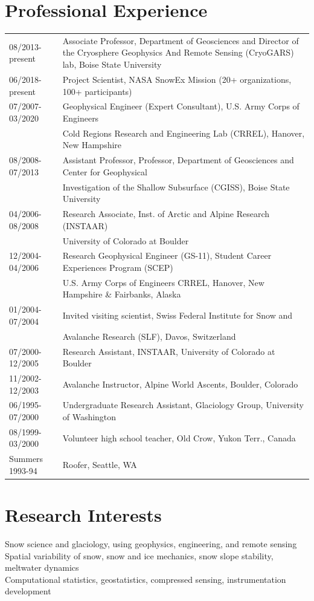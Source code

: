 \documentclass[11pt]{article}
\begin{document}
\section*{Professional Experience}
\begin{tabular}{ll}
08/2013-present & Associate Professor, Department of Geosciences and Director of the Cryosphere
Geophysics And Remote Sensing (CryoGARS) lab, Boise State University \\
06/2018-present & Project Scientist, NASA SnowEx Mission (20+ organizations, 100+ participants) \\
07/2007-03/2020 & Geophysical Engineer (Expert Consultant), U.S. Army Corps of Engineers \\
& Cold Regions Research and Engineering Lab (CRREL), Hanover, New Hampshire \\
08/2008-07/2013 & Assistant Professor, Professor, Department of Geosciences and Center for Geophysical \\
&   Investigation of the Shallow Subsurface (CGISS), Boise State University \\
04/2006-08/2008 & Research Associate, Inst. of Arctic and Alpine Research (INSTAAR) \\
& University of Colorado at Boulder \\ 
12/2004-04/2006 & Research Geophysical Engineer (GS-11), Student Career Experiences Program (SCEP) \\
& U.S. Army Corps of Engineers CRREL, Hanover, New Hampshire \& Fairbanks, Alaska \\
01/2004-07/2004 & Invited visiting scientist, Swiss Federal Institute for Snow and \\ 
& Avalanche Research (SLF), Davos, Switzerland \\ 
07/2000-12/2005 & Research Assistant, INSTAAR, University of Colorado at Boulder \\
11/2002-12/2003 & Avalanche Instructor, Alpine World Ascents, Boulder, Colorado \\
06/1995-07/2000 & Undergraduate Research Assistant, Glaciology Group, University of Washington \\
08/1999-03/2000 & Volunteer high school teacher, Old Crow, Yukon Terr., Canada \\
Summers 1993-94 & Roofer, Seattle, WA \\
\end{tabular}

\section*{Research Interests}
Snow science and glaciology, using geophysics, engineering, and remote sensing \\
Spatial variability of snow, snow and ice mechanics, snow slope stability, meltwater dynamics \\
Computational statistics, geostatistics, compressed sensing, instrumentation development \\
\end{document}
